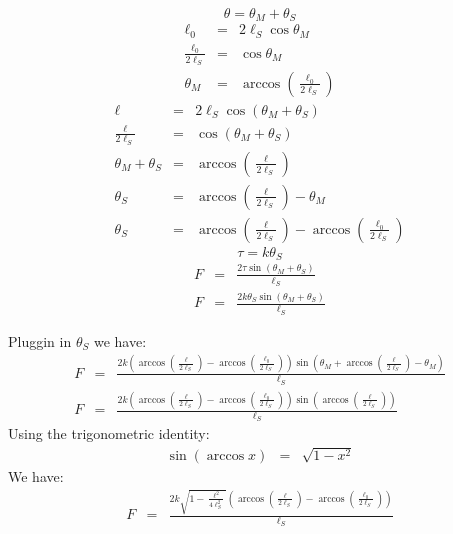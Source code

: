 \documentclass[letterpaper, 12 pt]{article}  %
\begin{document}
	\[
	\theta=\theta_{M}+\theta_{S}\]
	\begin{eqnarray*}
	\ell_{0} & = & 2\ell_{S}\cos\theta_{M}\\
	\frac{\ell_{0}}{2\ell_{S}} & = & \cos\theta_{M}\\
	\theta_{M} & = & \arccos\left(\frac{\ell_{0}}{2\ell_{S}}\right)\end{eqnarray*}
	\begin{eqnarray*}
	\ell & = & 2\ell_{S}\cos\left(\theta_{M}+\theta_{S}\right)\\
	\frac{\ell}{2\ell_{S}} & = & \cos\left(\theta_{M}+\theta_{S}\right)\\
	\theta_{M}+\theta_{S} & = & \arccos\left(\frac{\ell}{2\ell_{S}}\right)\\
	\theta_{S} & = & \arccos\left(\frac{\ell}{2\ell_{S}}\right)-\theta_{M}\\
	\theta_{S} & = & \arccos\left(\frac{\ell}{2\ell_{S}}\right)-\arccos\left(\frac{\ell_{0}}{2\ell_{S}}\right)\end{eqnarray*}
	\[
	\tau=k\theta_{S}\]
	\begin{eqnarray*}
	F & = & \frac{2\tau\sin\left(\theta_{M}+\theta_{S}\right)}{\ell_{S}}\\
	F & = & \frac{2k\theta_{S}\sin\left(\theta_{M}+\theta_{S}\right)}{\ell_{S}}\end{eqnarray*}


	Pluggin in $\theta_{S}$ we have:\begin{eqnarray*}
	F & = & \frac{2k\left(\arccos\left(\frac{\ell}{2\ell_{S}}\right)-\arccos\left(\frac{\ell_{0}}{2\ell_{S}}\right)\right)\sin\left(\theta_{M}+\arccos\left(\frac{\ell}{2\ell_{S}}\right)-\theta_{M}\right)}{\ell_{S}}\\
	F & = & \frac{2k\left(\arccos\left(\frac{\ell}{2\ell_{S}}\right)-\arccos\left(\frac{\ell_{0}}{2\ell_{S}}\right)\right)\sin\left(\arccos\left(\frac{\ell}{2\ell_{S}}\right)\right)}{\ell_{S}}\end{eqnarray*}
	Using the trigonometric identity:\begin{eqnarray*}
	\sin\left(\arccos x\right) & = & \sqrt{1-x^{2}}\end{eqnarray*}
	We have:\begin{eqnarray}
	F & = & \frac{2k\sqrt{1-\frac{\ell^{2}}{4\ell_{S}^{2}}}\left(\arccos\left(\frac{\ell}{2\ell_{S}}\right)-\arccos\left(\frac{\ell_{0}}{2\ell_{S}}\right)\right)}{\ell_{S}} \label{eq:fk}
	\end{eqnarray}
	
\end{document}
